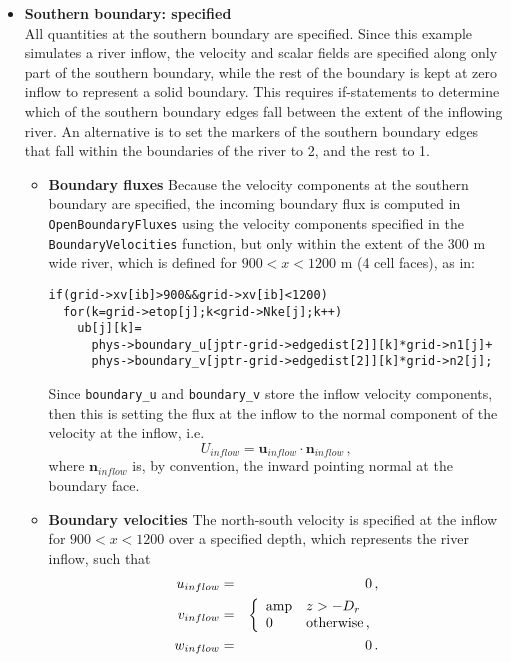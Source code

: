 \begin{itemize}
\item[] {\bf Southern boundary: specified}\\
All quantities at the southern boundary are specified.  Since this example simulates a river
inflow, the velocity and scalar fields are specified along only part of the southern boundary, while
the rest of the boundary is kept at zero inflow to represent a solid boundary.  This requires if-statements to
determine which of the southern boundary edges fall between the extent of the inflowing river.
An alternative is to set the markers of the southern boundary edges that fall within the boundaries
of the river to 2, and the rest to 1. 
\begin{itemize}
\item[] {\bf Boundary fluxes}
Because the velocity components at the southern boundary are specified, the incoming boundary
flux is computed in \verb+OpenBoundaryFluxes+ using the velocity components specified in the \verb+BoundaryVelocities+ function,
but only within the extent of the 300 m wide river, which is defined for $900 < x < 1200$ m (4 cell faces), as in:
\begin{verbatim}
if(grid->xv[ib]>900&&grid->xv[ib]<1200)
  for(k=grid->etop[j];k<grid->Nke[j];k++) 
    ub[j][k]=
      phys->boundary_u[jptr-grid->edgedist[2]][k]*grid->n1[j]+
      phys->boundary_v[jptr-grid->edgedist[2]][k]*grid->n2[j];
\end{verbatim}
Since \verb+boundary_u+ and \verb+boundary_v+ store the inflow velocity components, then this
is setting the flux at the inflow to the normal component of the velocity at the inflow, i.e.
\[
U_{inflow} = {\mathbf u}_{inflow}\cdot {\mathbf n}_{inflow}\,,
\]
where ${\mathbf n}_{inflow}$ is, by convention, the inward pointing normal at the boundary face.
\item[] {\bf Boundary velocities}
The north-south velocity is specified at the inflow for $900 < x < 1200$ over a specified depth,
which represents the river inflow, such that
\begin{eqnarray}
u_{inflow} &=& 0\,,\nonumber\\
v_{inflow} &=& \left\{\begin{array}{ll}
                    \mbox{amp} & z>-D_r \\
		    0 & \mbox{otherwise\,,}
		    \end{array}
             \right.\nonumber\\
w_{inflow} &=& 0\,.\nonumber
\end{eqnarray}

\end{itemize}
\end{itemize}
